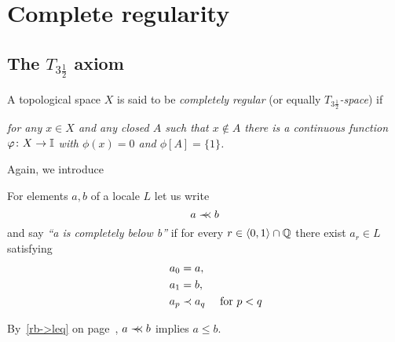 \chapter{Complete regularity}

\section{The $T_{3\frac{1}{2}}$ axiom}

\begin{framed}
  \begin{df}[$T_{3\frac{1}{2}}$]
    A topological space $X$ is said to be \emph{completely regular\/} (or
    equally \emph{$T_{3\frac{1}{2}}$-space\/}) if
    \begin{center} \it
      for any $x\in X$ and any closed $A$ such that $x\not\in A$ there is a
      continuous function $\varphi\colon X \to \mathbb{I}$ with $\phi(x) = 0$ and $\phi[A]
      = \{1\}$.
    \end{center}
  \end{df}
\end{framed}

Again, we introduce

\begin{framed}
  \begin{nota}[$\cb$]
    For elements $a, b$ of a locale $L$ let us write
    \[
      a \prec\mkern-8mu\prec b
    \]
    and say \emph{``a is completely below b''\/} if for every $r\in \langle 0,
    1 \rangle \cap \mathbb{Q}$ there exist $a_r\in L$ satisfying
    \begin{align*}
      a_0 &= a, \\
      a_1 &= b, \\
      \qquad a_p &\prec a_q \quad \text{ for } p < q
    \end{align*}
  \end{nota}
\end{framed}

\begin{rem}
  By~\ref{rb->leq} on page~\pageref{rb->leq}\thinspace, $a \prec\mkern-8mu\prec b$
  implies $a \le b$.
\end{rem}

